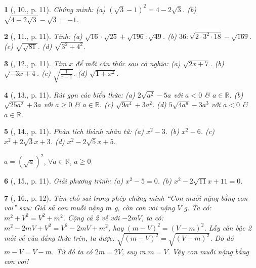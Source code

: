 \documentclass{article}
\newtheorem{baitoan}{}%
\begin{document}
\begin{baitoan}[\cite{SGK_Toan_9_tap_1}, 10., p. 11]
	Chứng minh: (a) $(\sqrt{3} - 1)^2 = 4 - 2\sqrt{3}$. (b) $\sqrt{4 - 2\sqrt{3}} - \sqrt{3} = -1$.
\end{baitoan}

\begin{baitoan}[\cite{SGK_Toan_9_tap_1}, 11., p. 11]
	Tính: (a) $\sqrt{16}\cdot\sqrt{25} + \sqrt{196}:\sqrt{49}$. (b) $36:\sqrt{2\cdot3^2\cdot18} - \sqrt{169}$. (c)  $\sqrt{\sqrt{81}}$. (d) $\sqrt{3^2 + 4^2}$.
\end{baitoan}

\begin{baitoan}[\cite{SGK_Toan_9_tap_1}, 12., p. 11]
	Tìm $x$ để mỗi căn thức sau có nghĩa: (a) $\sqrt{2x + 7}$. (b) $\sqrt{-3x + 4}$. (c) $\sqrt{\frac{1}{x - 1}}$. (d) $\sqrt{1 + x^2}$.
\end{baitoan}

\begin{baitoan}[\cite{SGK_Toan_9_tap_1}, 13., p. 11]
	Rút gọn các biểu thức: (a) $2\sqrt{a^2} - 5a$ với $a < 0$ \& $a\in\mathbb{R}$. (b) $\sqrt{25a^2} + 3a$ với $a\ge0$ \& $a\in\mathbb{R}$. (c) $\sqrt{9a^4} + 3a^2$. (d) $5\sqrt{4a^6} - 3a^3$ với $a < 0$ \& $a\in\mathbb{R}$.
\end{baitoan}

\begin{baitoan}[\cite{SGK_Toan_9_tap_1}, 14., p. 11]
	Phân tích thành nhân tử: (a) $x^2 - 3$. (b) $x^2 - 6$. (c) $x^2 + 2\sqrt{3}x + 3$. (d) $x^2 - 2\sqrt{5}x + 5$.
\end{baitoan}
 $a = (\sqrt{a})^2$, $\forall a\in\mathbb{R}$, $a\ge0$.

\begin{baitoan}[\cite{SGK_Toan_9_tap_1}, 15., p. 11]
	Giải phương trình: (a) $x^2 - 5 = 0$. (b) $x^2 - 2\sqrt{11}x + 11 = 0$.
\end{baitoan}

\begin{baitoan}[\cite{SGK_Toan_9_tap_1}, 16., p. 12]
	Tìm chỗ sai trong phép chứng minh ``Con muỗi nặng bằng con voi'' sau: Giả sử con muỗi nặng $m$ \emph{g}, còn con voi nặng $V$ \emph{g}. Ta có: $m^2 + V^2 = V^2 + m^2$. Cộng cả 2 vế với $-2mV$, ta có: $m^2 - 2mV + V^2 = V^2 - 2mV + m^2$, hay $(m - V)^2 = (V - m)^2$. Lấy căn bậc 2 mỗi vế của đẳng thức trên, ta được: $\sqrt{(m - V)^2} = \sqrt{(V - m)^2}$. Do đó $m - V = V - m$. Từ đó ta có $2m = 2V$, suy ra $m = V$. Vậy con muỗi nặng bằng con voi!
\end{baitoan}
\end{document}
